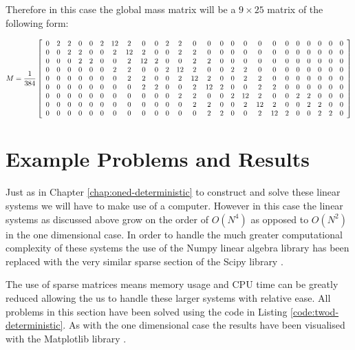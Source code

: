 Therefore in this case the global mass matrix will be a $9 \times 25$ matrix of
the following form:

\begin{equation}
    M = \frac{1}{384}
        \left[\begin{array}{c c c c c c c c c c c c c c c c c c c c c c c c c}
    0 & 2 & 2 & 0 & 0 & 2 & 12 & 2 & 0 & 0 & 2 & 2 & 0 & 0 & 0 & 0 & 0 & 0 & 0 & 0 & 0 & 0 & 0 & 0 & 0 \\
    0 & 0 & 2 & 2 & 0 & 0 & 2 & 12 & 2 & 0 & 0 & 2 & 2 & 0 & 0 & 0 & 0 & 0 & 0 & 0 & 0 & 0 & 0 & 0 & 0 \\
    0 & 0 & 0 & 2 & 2 & 0 & 0 & 2 & 12 & 2 & 0 & 0 & 2 & 2 & 0 & 0 & 0 & 0 & 0 & 0 & 0 & 0 & 0 & 0 & 0 \\
    0 & 0 & 0 & 0 & 0 & 0 & 2 & 2 & 0 & 0 & 2 & 12 & 2 & 0 & 0 & 2 & 2 & 0 & 0 & 0 & 0 & 0 & 0 & 0 & 0 \\
    0 & 0 & 0 & 0 & 0 & 0 & 0 & 2 & 2 & 0 & 0 & 2 & 12 & 2 & 0 & 0 & 2 & 2 & 0 & 0 & 0 & 0 & 0 & 0 & 0 \\
    0 & 0 & 0 & 0 & 0 & 0 & 0 & 0 & 2 & 2 & 0 & 0 & 2 & 12 & 2 & 0 & 0 & 2 & 2 & 0 & 0 & 0 & 0 & 0 & 0 \\
    0 & 0 & 0 & 0 & 0 & 0 & 0 & 0 & 0 & 0 & 0 & 2 & 2 & 0 & 0 & 2 & 12 & 2 & 0 & 0 & 2 & 2 & 0 & 0 & 0 \\
    0 & 0 & 0 & 0 & 0 & 0 & 0 & 0 & 0 & 0 & 0 & 0 & 2 & 2 & 0 & 0 & 2 & 12 & 2 & 0 & 0 & 2 & 2 & 0 & 0 \\
    0 & 0 & 0 & 0 & 0 & 0 & 0 & 0 & 0 & 0 & 0 & 0 & 0 & 2 & 2 & 0 & 0 & 2 & 12 & 2 & 0 & 0 & 2 & 2 & 0
    \end{array}\right]
\end{equation}

\section{Example Problems and Results}

Just as in Chapter \ref{chap:oned-deterministic} to construct and solve these
linear systems we will have to make use of a computer. However in this case the
linear systems as discussed above  grow
on the order of $O(N^4)$ as opposed to $O(N^2)$ in the one dimensional case. In
order to handle the much greater computational complexity of these systems the
use of the Numpy linear algebra library has been replaced with the very similar
sparse section of the Scipy library \cite{scipy}.

The use of sparse matrices means memory usage and CPU time can be greatly
reduced allowing the us to handle these larger systems with relative ease. All
problems in this section have been solved using the code in Listing
\ref{code:twod-deterministic}. As with the one dimensional case the results
have been visualised with the Matplotlib library \cite{matplotlib}.

